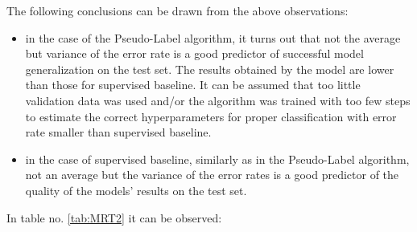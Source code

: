\documentclass[12pt]{article}
\theoremstyle{definition}
\DeclareRobustCommand{\[}{\begin{equation}}
\DeclareRobustCommand{\]}{\end{equation}}
\begin{document}
\vspace{5mm} %
The following conclusions can be drawn from the above observations:
    \begin{itemize}
        \item in the case of the Pseudo-Label algorithm, it turns out that not the average but variance of the error rate is a good predictor of successful model generalization on the test set. The results obtained by the model are lower than those for supervised baseline. It can be assumed that too little validation data was used and/or the algorithm was trained with too few steps to estimate the correct hyperparameters for proper classification with error rate smaller than supervised baseline.
        \item in the case of supervised baseline, similarly as in the Pseudo-Label algorithm, not an average but the variance of the error rates is a good predictor of the quality of the models' results on the test set. 
    \end{itemize}
\newline
\vspace{5mm} %
\vspace{5mm} %
In table no. \ref{tab:MRT2} it can be observed:
\end{document}
